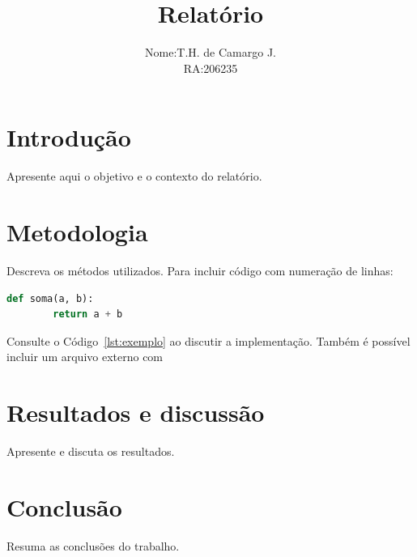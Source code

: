 \documentclass[12pt,a4paper]{article}
\title{Relatório}
\author{%
	\begin{tabular}{rl}
		Nome: & T.H. de Camargo J. \\
		RA: & 206235
	\end{tabular}%
}
\date{\DTMusedate{reportdate}}
\begin{document}
\maketitle

\section{Introdução}
Apresente aqui o objetivo e o contexto do relatório.

\section{Metodologia}
Descreva os métodos utilizados. Para incluir código com numeração de linhas:

\begin{lstlisting}[language=Python, caption={Exemplo de código}, label={lst:exemplo}]
def soma(a, b):
		return a + b
\end{lstlisting}

Consulte o Código~\ref{lst:exemplo} ao discutir a implementação.
Também é possível incluir um arquivo externo com



\section{Resultados e discussão}
Apresente e discuta os resultados.

\section{Conclusão}
Resuma as conclusões do trabalho.
\end{document}

